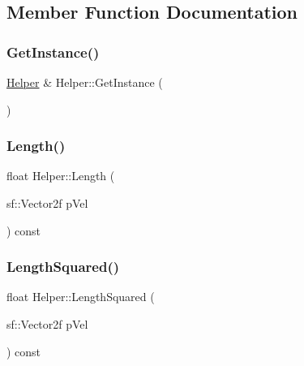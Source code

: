 \subsection{Member Function Documentation}
\hypertarget{class_helper_a2efdc8231bed2315ec951558af552f31}{}\label{class_helper_a2efdc8231bed2315ec951558af552f31} 
\subsubsection{\texorpdfstring{Get\+Instance()}{GetInstance()}}
{\footnotesize\ttfamily \hyperlink{class_helper}{Helper} \& Helper\+::\+Get\+Instance (\begin{DoxyParamCaption}{ }\end{DoxyParamCaption})\hspace{0.3cm}{\ttfamily [static]}}

\hypertarget{class_helper_a0cde798c2e2940f733c0d82062a32994}{}\label{class_helper_a0cde798c2e2940f733c0d82062a32994} 
\subsubsection{\texorpdfstring{Length()}{Length()}}
{\footnotesize\ttfamily float Helper\+::\+Length (\begin{DoxyParamCaption}\item[{sf\+::\+Vector2f}]{p\+Vel }\end{DoxyParamCaption}) const}

\hypertarget{class_helper_a7f7c47be61f23ba30a71119f9dbbf847}{}\label{class_helper_a7f7c47be61f23ba30a71119f9dbbf847} 
\subsubsection{\texorpdfstring{Length\+Squared()}{LengthSquared()}}
{\footnotesize\ttfamily float Helper\+::\+Length\+Squared (\begin{DoxyParamCaption}\item[{sf\+::\+Vector2f}]{p\+Vel }\end{DoxyParamCaption}) const}

\hypertarget{class_helper_a7b3164a812d73c432b84e9ea1d2df507}{}\label{class_helper_a7b3164a812d73c432b84e9ea1d2df507} 
